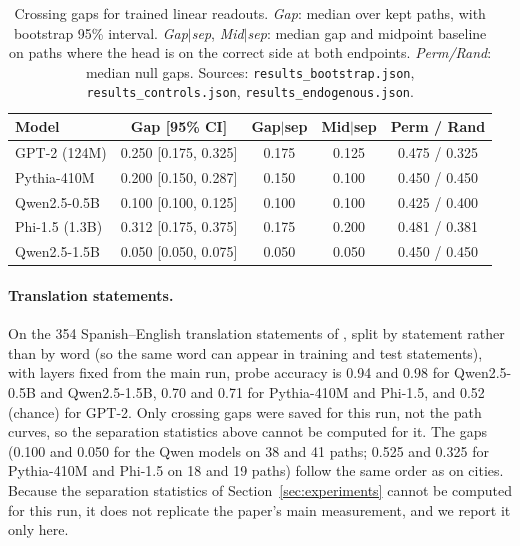 \documentclass[10pt]{article}
\theoremstyle{definition}
\theoremstyle{remark}
\begin{document}
\begin{table}[h]
\centering
\caption{Crossing gaps for trained linear readouts. \emph{Gap}: median
over kept paths, with bootstrap 95\% interval. \emph{Gap$\mid$sep},
\emph{Mid$\mid$sep}: median gap and midpoint baseline on paths where the
head is on the correct side at both endpoints. \emph{Perm/Rand}: median
null gaps. Sources: \texttt{results\_bootstrap.json},
\texttt{results\_controls.json}, \texttt{results\_endogenous.json}.}
\label{tab:gaps}
\footnotesize
\begin{tabular}{@{}lcccc@{}}
\toprule
Model & Gap [95\% CI] & Gap$\mid$sep & Mid$\mid$sep & Perm / Rand \\
\midrule
GPT-2 (124M)   & 0.250 [0.175, 0.325] & 0.175 & 0.125 & 0.475 / 0.325 \\
Pythia-410M    & 0.200 [0.150, 0.287] & 0.150 & 0.100 & 0.450 / 0.450 \\
Qwen2.5-0.5B   & 0.100 [0.100, 0.125] & 0.100 & 0.100 & 0.425 / 0.400 \\
Phi-1.5 (1.3B) & 0.312 [0.175, 0.375] & 0.175 & 0.200 & 0.481 / 0.381 \\
Qwen2.5-1.5B   & 0.050 [0.050, 0.075] & 0.050 & 0.050 & 0.450 / 0.450 \\
\bottomrule
\end{tabular}
\end{table}

\paragraph{Translation statements.}
On the 354 Spanish--English translation statements of
\citet{marks2024geometry}, split by statement rather than by word (so the
same word can appear in training and test statements), with layers fixed
from the main run, probe
accuracy is 0.94 and 0.98 for Qwen2.5-0.5B and Qwen2.5-1.5B, 0.70 and 0.71
for Pythia-410M and Phi-1.5, and 0.52 (chance) for GPT-2. Only crossing
gaps were saved for this run, not the path curves, so the separation
statistics above cannot be computed for it. The gaps (0.100 and 0.050 for
the Qwen models on 38 and 41 paths; 0.525 and 0.325 for Pythia-410M and
Phi-1.5 on 18 and 19 paths) follow the same order as on cities. Because the separation statistics of Section~\ref{sec:experiments} cannot be computed for this run, it does not replicate the paper's main measurement, and we report it only here.
\end{document}
